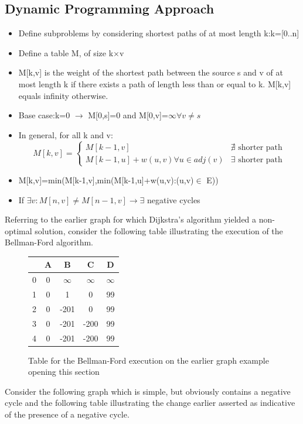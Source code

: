 \documentclass[12pt,letterpaper]{article}
\begin{document}
\subsection{Dynamic Programming Approach}
\begin{itemize}
\item Define subproblems by considering shortest paths of at most length k:k=[0..n]
\item Define a table M, of size k$\times$v
\item M[k,v] is the weight of the shortest path between the source s and v of at most length k if there exists a path of length less than or equal to k. M[k,v] equals infinity otherwise. 
\item Base case:k=0 $\to$ M[0,s]=0 and M[0,v]=$\infty\forall v\neq s$
\item In general, for all k and v:
\[M[k,v]=\begin{cases}M[k-1,v] & \nexists\text{ shorter path}\\ M[k-1,u]+w(u,v)\forall u \in adj(v)& \exists\text{ shorter path}\end{cases}\]
\item M[k,v]=min(M[k-1,v],min(M[k-1,u]+w(u,v):(u,v)$\in$ E))
\item If $\exists v: M[n,v]\neq M[n-1,v]\to \exists$ negative cycles
\end{itemize}
Referring to the earlier graph for which Dijkstra's algorithm yielded a non-optimal solution, consider the following table illustrating the execution of the Bellman-Ford algorithm.
\begin{figure}[h]
\centering
\begin{tabular}{|c|c|c|c|c|}
\hline
 &A&B&C&D\\ \hline \hline
0&0&$\infty$&$\infty$&$\infty$\\ \hline
1&0&1&0&99\\ \hline
2&0&-201&0&99\\ \hline
3&0&-201&-200&99\\ \hline
4&0&-201&-200&99\\ \hline
\end{tabular}
\caption{Table for the Bellman-Ford execution on the earlier graph example opening this section}
\end{figure}
Consider the following graph which is simple, but obviously contains a negative cycle and the following table illustrating the change earlier asserted as indicative of the presence of a negative cycle. 
\end{document}
